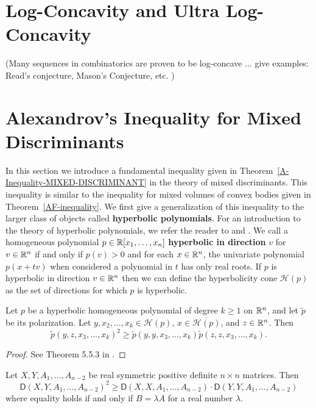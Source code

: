 \documentclass{puthesis-UG}
\begin{document}
\section{Log-Concavity and Ultra Log-Concavity}

\begin{defn}

\end{defn}

(Many sequences in combinatorics are proven to be log-concave ... give examples: Read's conjecture, Mason's Conjecture, etc. )
\section{Alexandrov's Inequality for Mixed Discriminants}

In this section we introduce a fundamental inequality given in Theorem~\ref{A-Inequality-MIXED-DISCRIMINANT} in the theory of mixed discriminants. This inequality is similar to the inequality for mixed volumes of convex bodies given in Theorem~\ref{AF-inequality}. We first give a generalization of this inequality to the larger class of objects called \textbf{hyperbolic polynomials}. For an introduction to the theory of hyperbolic polynomials, we refer the reader to \cite{schneider_2013} and \cite{hyperbolic-polynomials}. We call a homogeneous polynomial $p \in \mathbb{R}[x_1, \ldots, x_n]$ \textbf{hyperbolic in direction} $v$ for $v \in \mathbb{R}^n$ if and only if $p(v) > 0$ and for each $x \in \mathbb{R}^n$, the univariate polynomial $p(x + tv)$ when considered a polynomial in $t$ has only real roots. If $p$ is hyperbolic in direction $v \in \mathbb{R}^n$ then we can define the hyperbolicity cone $\mathcal{H} (p)$ as the set of directions for which $p$ is hyperbolic. 

\begin{thm}
	Let $p$ be a hyperbolic homogeneous polynomial of degree $k \geq 1$ on $\mathbb{R}^n$, and let $\tilde{p}$ be its polarization. Let $y, x_2, \ldots, x_k \in \mathcal{H}(p)$, $x \in \overline{\mathcal{H}(p)}$, and $z \in \mathbb{R}^n$. Then 
	\[
		\widetilde{p}(y, z, x_3, \ldots, x_k)^2 \geq \widetilde{p}(y, y, x_3, \ldots, x_k) \widetilde{p} (z, z, x_3, \ldots, x_k).
	\]
\end{thm}

\begin{proof}
	See Theorem 5.5.3 in \cite{schneider_2013}.
\end{proof}

\begin{thm}  \label{A-Inequality-MIXED-DISCRIMINANT}
	Let $X, Y, A_1, \ldots, A_{n-2}$ be real symmetric positive definite $n \times n$ matrices. Then 
	\[
		\mathsf{D}(X, Y, A_1, \ldots, A_{n-2})^2 \geq \mathsf{D}(X, X, A_1, \ldots, A_{n-2}) \cdot \mathsf{D} (Y, Y, A_1, \ldots, A_{n-2})
	\]
	where equality holds if and only if $B = \lambda A$ for a real number $\lambda$. 
\end{thm}
\end{document}

